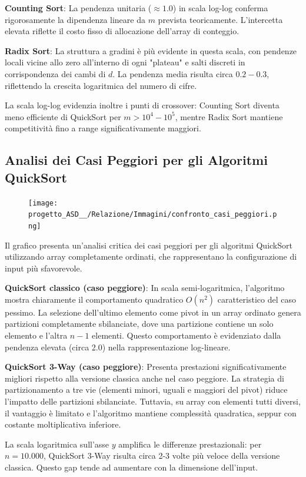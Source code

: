 \documentclass[a4paper, 11pt]{article}
\begin{document}
\textbf{Counting Sort}: La pendenza unitaria ($\approx 1.0$) in scala log-log conferma rigorosamente la dipendenza lineare da $m$ prevista teoricamente. L'intercetta elevata riflette il costo fisso di allocazione dell'array di conteggio.

\textbf{Radix Sort}: La struttura a gradini è più evidente in questa scala, con pendenze locali vicine allo zero all'interno di ogni "plateau" e salti discreti in corrispondenza dei cambi di $d$. La pendenza media risulta circa $0.2 - 0.3$, riflettendo la crescita logaritmica del numero di cifre.

La scala log-log evidenzia inoltre i punti di crossover: Counting Sort diventa meno efficiente di QuickSort per $m > 10^4 - 10^5$, mentre Radix Sort mantiene competitività fino a range significativamente maggiori.

\subsection{Analisi dei Casi Peggiori per gli Algoritmi QuickSort}
\begin{figure}[H]
\centering
\texttt{[image: progetto\_ASD\_\_/Relazione/Immagini/confronto\_casi\_peggiori.png]}
\label{fig:variazione_m}
\end{figure}

Il grafico presenta un'analisi critica dei casi peggiori per gli algoritmi QuickSort utilizzando array completamente ordinati, che rappresentano la configurazione di input più sfavorevole.

\textbf{QuickSort classico (caso peggiore)}: In scala semi-logaritmica, l'algoritmo mostra chiaramente il comportamento quadratico $O(n^2)$ caratteristico del caso pessimo. La selezione dell'ultimo elemento come pivot in un array ordinato genera partizioni completamente sbilanciate, dove una partizione contiene un solo elemento e l'altra $n-1$ elementi. Questo comportamento è evidenziato dalla pendenza elevata (circa 2.0) nella rappresentazione log-lineare.

\textbf{QuickSort 3-Way (caso peggiore)}: Presenta prestazioni significativamente migliori rispetto alla versione classica anche nel caso peggiore. La strategia di partizionamento a tre vie (elementi minori, uguali e maggiori del pivot) riduce l'impatto delle partizioni sbilanciate. Tuttavia, su array con elementi tutti diversi, il vantaggio è limitato e l'algoritmo mantiene complessità quadratica, seppur con costante moltiplicativa inferiore.

La scala logaritmica sull'asse $y$ amplifica le differenze prestazionali: per $n = 10.000$, QuickSort 3-Way risulta circa 2-3 volte più veloce della versione classica. Questo gap tende ad aumentare con la dimensione dell'input.
\end{document}
